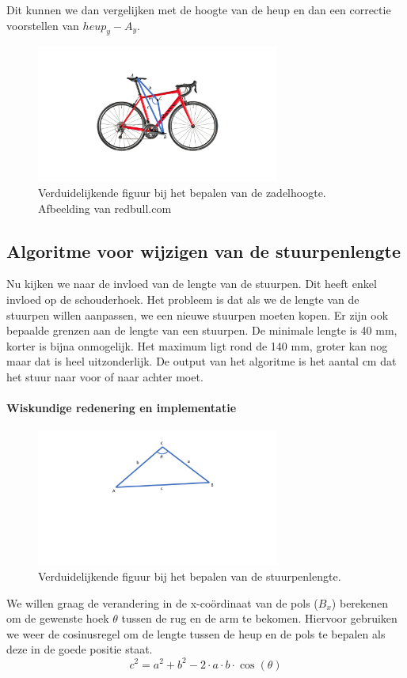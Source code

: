 \documentclass[a4paper,twoside,kulak]{kulakreport}
\begin{document}
Dit kunnen we dan vergelijken met de hoogte van de heup en dan een correctie voorstellen van \(heup_y - A_y\).
\begin{figure}
	\begin{center}
		\includegraphics[width=8cm]{fiets.pdf}
	\end{center}
	\caption{Verduidelijkende figuur bij het bepalen van de zadelhoogte. Afbeelding van redbull.com}
	\label{fiets}
\end{figure}

\subsection{Algoritme voor wijzigen van de stuurpenlengte}

Nu kijken we naar de invloed van de lengte van de stuurpen. Dit heeft enkel invloed op de schouderhoek. Het probleem is dat als we de lengte van de stuurpen willen aanpassen, we een nieuwe stuurpen moeten kopen. Er zijn ook bepaalde grenzen aan de lengte van een stuurpen. De minimale lengte is 40 \si{mm}, korter is bijna onmogelijk. Het maximum ligt rond de 140 \si{mm}, groter kan nog maar dat is heel uitzonderlijk. De output van het algoritme is het aantal \si{cm} dat het stuur naar voor of naar achter moet.


\paragraph{Wiskundige redenering en implementatie}

\begin{figure}
	\begin{center}
		\includegraphics[width=8cm]{yeye.pdf}
	\end{center}
	\caption{Verduidelijkende figuur bij het bepalen van de stuurpenlengte.}
	\label{stuurpenlengte}
\end{figure}
We willen graag de verandering in de x-coördinaat van de pols (\(B_x\)) berekenen om de gewenste hoek $\theta$ tussen de rug en de arm te bekomen. Hiervoor gebruiken we weer de cosinusregel om de lengte tussen de heup en de pols te bepalen als deze in de goede positie staat.
\[c^2 = a^2 + b^2 -2\cdot a\cdot b\cdot \cos(\theta)\]
\end{document}
